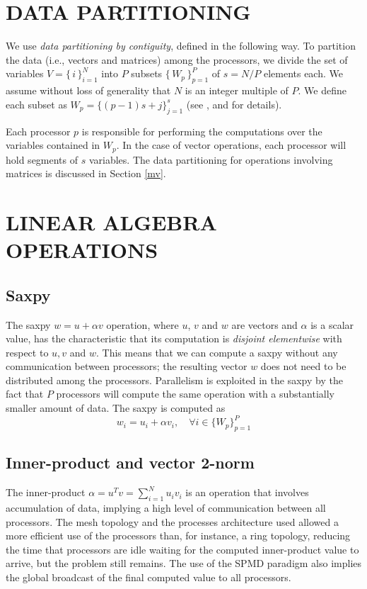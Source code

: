 \documentclass{ecai2012}
\begin{document}
\section{DATA PARTITIONING}
\label{datapart}
We use \emph{data partitioning by contiguity}, defined in the
following way. To partition the data (i.e., vectors and matrices)
among the processors, we divide the set of variables
\mbox{$V=\{\,i\,\}_{i=1}^{N}$} into $P$ subsets
$\{\,W_{p}\,\}_{p=1}^{P}$ of $s=N/P$ elements each. We assume without
loss of generality that $N$ is an integer multiple of $P$. We define
each subset as $W_{p}=\{(p-1)s+j\}_{j=1}^{s}$ (see
\cite{kn:Schofield89}, \cite{kn:daCunha92a} and \cite{kn:Atkin} for
details).

Each processor $p$ is responsible for performing the computations over
the variables contained in $W_{p}$. In the case of vector operations,
each processor will hold segments of $s$ variables. The data
partitioning for operations involving matrices is discussed in Section
\ref{mv}.
\section{LINEAR ALGEBRA OPERATIONS}
\label{blas}
\subsection{Saxpy}
\label{saxpy}
The saxpy $w=u+\alpha v$ operation, where $u$, $v$ and $w$ are vectors
and $\alpha$ is a scalar value, has the characteristic that its
computation is \emph{disjoint elementwise} with respect to $u, v$ and
$w$. This means that we can compute a saxpy without any communication
between processors; the resulting vector $w$ does not need to be
distributed among the processors. Parallelism is exploited in the
saxpy by the fact that $P$ processors will compute the same operation
with a substantially smaller amount of data. The saxpy is computed as
\begin{equation}
w_{i}=u_{i}+\alpha v_{i},\quad \forall i\in\{W_{p}\}_{p=1}^{P}
\label{distsaxpy}
\end{equation}
\subsection{Inner-product and vector 2-norm}
\label{utv}
The inner-product $\alpha=u^{T}v=\sum_{i=1}^{N}{u_{i}v_{i}}$ is an
operation that involves accumulation of data, implying a high level of
communication between all processors. The mesh topology and the
processes architecture used allowed a more efficient use of the
processors than, for instance, a ring topology, reducing the time that
processors are idle waiting for the computed inner-product value to
arrive, but the problem still remains. The use of the SPMD paradigm
also implies the global broadcast of the final computed value to all
processors.
\end{document}
